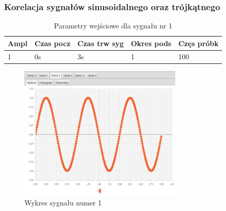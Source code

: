 \documentclass[12pt]{article}
\begin{document}
{{            \subsubsection{Korelacja sygnałów sinusoidalnego oraz trójkątnego} \label{eksperyment:korelacja3}{

                \begin{table}[H]
                    \centering
                    \begin{tabular}{|l|l|l|l|l|}
                        \hline
                        Ampl & Czas pocz & Czas trw syg & Okres pods & Częs próbk   \\\hline
                        1 & 0s & 3s & 1 & 100           \\\hline
                    \end{tabular}
                    \caption{Parametry wejściowe dla sygnału nr 1}
                \end{table}
                \begin{figure}[H]
                    \centering
                    \includegraphics[width=0.7\textwidth]{img/result/correlation/experiment3/data_124714.png}
                    \caption{Wykres sygnału numer 1}
                \end{figure}

}}}
\end{document}
